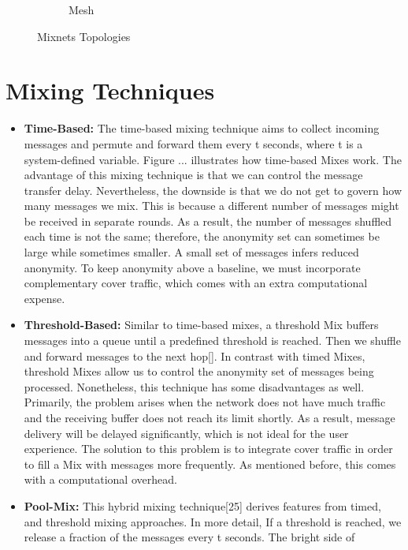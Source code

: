 \documentclass[logo,msc,cyber]{infthesis}   %
\begin{document}
\begin{figure}[h!]
\begin{subfigure}[b]{0.45\textwidth}
        \caption{Mesh}
        \label{fig:mesh}
    \end{subfigure}
       \caption{Mixnets Topologies}
       \label{fig:mixnets-topologies}
\end{figure}

\section{Mixing Techniques}

\begin{itemize}
   \item \textbf{Time-Based:} The time-based mixing technique aims to collect
   incoming messages and permute and forward them every t seconds, where t is a
   system-defined variable. Figure ... illustrates how time-based Mixes work.
   The advantage of this mixing technique is that we can control the message
   transfer delay. Nevertheless, the downside is that we do not get to govern
   how many messages we mix. This is because a different number of messages
   might be received in separate rounds. As a result, the number of messages
   shuffled each time is not the same; therefore, the anonymity set can
   sometimes be large while sometimes smaller. A small set of messages infers
   reduced anonymity. To keep anonymity above a baseline, we must incorporate
   complementary cover traffic, which comes with an extra computational expense.
   \item \textbf{Threshold-Based:} Similar to time-based mixes, a threshold Mix buffers
   messages into a queue until a predefined threshold is reached. Then we
   shuffle and forward messages to the next hop[]. In contrast with timed Mixes,
   threshold Mixes allow us to control the anonymity set of messages being
   processed. Nonetheless, this technique has some disadvantages as well.
   Primarily, the problem arises when the network does not have much traffic and
   the receiving buffer does not reach its limit shortly. As a result, message
   delivery will be delayed significantly, which is not ideal for the user
   experience. The solution to this problem is to integrate cover traffic in
   order to fill a Mix with messages more frequently. As mentioned before, this
   comes with a computational overhead.
   \item \textbf{Pool-Mix:} This hybrid mixing technique[25] derives features from timed,
   and threshold mixing approaches. In more detail, If a threshold is reached,
   we release a fraction of the messages every t seconds. The bright side of

\end{itemize}
\end{document}
